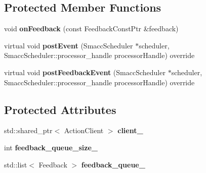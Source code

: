 \subsection*{Protected Member Functions}
\begin{DoxyCompactItemize}
\item 
\hypertarget{classsmacc_1_1SmaccActionClientBase_a9ba39f09edcf9a4737d8cb0f0d6ee5e2}{void {\bfseries on\-Feedback} (const Feedback\-Const\-Ptr \&feedback)}\label{classsmacc_1_1SmaccActionClientBase_a9ba39f09edcf9a4737d8cb0f0d6ee5e2}

\item 
\hypertarget{classsmacc_1_1SmaccActionClientBase_a2e2d131731d54ea529f6ff2ebb0c63cd}{virtual void {\bfseries post\-Event} (Smacc\-Scheduler $\ast$scheduler, Smacc\-Scheduler\-::processor\-\_\-handle processor\-Handle) override}\label{classsmacc_1_1SmaccActionClientBase_a2e2d131731d54ea529f6ff2ebb0c63cd}

\item 
\hypertarget{classsmacc_1_1SmaccActionClientBase_a8e500f37853599d32c39483d442ede72}{virtual void {\bfseries post\-Feedback\-Event} (Smacc\-Scheduler $\ast$scheduler, Smacc\-Scheduler\-::processor\-\_\-handle processor\-Handle) override}\label{classsmacc_1_1SmaccActionClientBase_a8e500f37853599d32c39483d442ede72}

\end{DoxyCompactItemize}
\subsection*{Protected Attributes}
\begin{DoxyCompactItemize}
\item 
\hypertarget{classsmacc_1_1SmaccActionClientBase_a10d3b707b855c6d360aeeb35e50cd0c7}{std\-::shared\-\_\-ptr$<$ Action\-Client $>$ {\bfseries client\-\_\-}}\label{classsmacc_1_1SmaccActionClientBase_a10d3b707b855c6d360aeeb35e50cd0c7}

\item 
\hypertarget{classsmacc_1_1SmaccActionClientBase_a834575fe2be93d0ccada8c1d486c49cd}{int {\bfseries feedback\-\_\-queue\-\_\-size\-\_\-}}\label{classsmacc_1_1SmaccActionClientBase_a834575fe2be93d0ccada8c1d486c49cd}

\item 
\hypertarget{classsmacc_1_1SmaccActionClientBase_a66fe8948b906b832b06b5dae469d8dc4}{std\-::list$<$ Feedback $>$ {\bfseries feedback\-\_\-queue\-\_\-}}\label{classsmacc_1_1SmaccActionClientBase_a66fe8948b906b832b06b5dae469d8dc4}

\end{DoxyCompactItemize}

